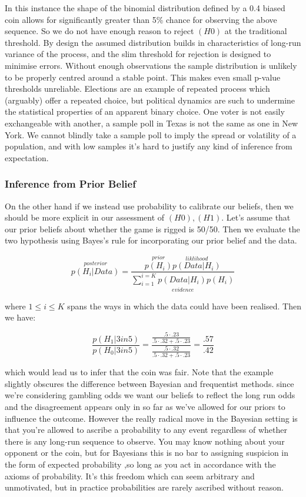 \documentclass[10pt,a4paper,notitlepage, twocolumn]{article}
\begin{document}
In this instance the shape of the binomial distribution defined by a 0.4 biased coin allows for significantly greater than  5\% chance for observing the above sequence. So we do not have enough reason to reject $(H0)$ at the traditional threshold. By design the assumed distribution builds in characteristics of long-run variance of the process, and the slim threshold for rejection is designed to minimise errors. Without enough observations the sample distribution is unlikely to be properly centred around a stable point. This makes even small p-value thresholds unreliable. Elections are an example of repeated process which (arguably) offer a repeated choice, but political dynamics are such to undermine the statistical properties of an apparent binary choice. One voter is not easily exchangeable with another, a sample poll in Texas is not the same as one in New York. We cannot blindly take a sample poll to imply the spread or volatility of a population, and with low samples it's hard to justify any kind of inference from expectation.

\subsubsection*{Inference from Prior Belief}
On the other hand if we instead use probability to calibrate our beliefs, then we should be more explicit in our assessment of $(H0), (H1)$. Let's assume that our prior beliefs about whether the game is rigged is 50/50. Then we evaluate the two hypothesis using Bayes's rule for incorporating our prior belief and the data. 

$$ \overset{posterior}{p(H_{i} | Data)} = \frac{\overset{prior}{p(H_{i})}\overset{liklihood}{p(Data | H_{i})}}{\underset{evidence}{\sum_{i=1}^{i =K} p(Data | H_{i})p(H_i)}}$$

where $ 1 \leq i \leq K$ spans the ways in which the data could have been realised. Then we have:

$$ \frac{p(H_1 | 3 in 5)}{p(H_{0} | 3 in 5)} = \frac{\frac{.5\cdot .23}{.5\cdot .32 + .5 \cdot .23}}{\frac{.5\cdot .32}{.5\cdot .32 + .5 \cdot .23}} = \frac{.57}{.42} $$

which would lead us to infer that the coin was fair. Note that the example slightly obscures the difference between Bayesian and frequentist methods. since we're considering gambling odds we want our beliefs to reflect the long run odds and the disagreement appears only in so far as we've allowed for our priors to influence the outcome. However the really radical move in the Bayesian setting is that you're allowed to ascribe a probability to any event regardless of whether there is any long-run sequence to observe. You may know nothing about your opponent or the coin, but for Bayesians this is no bar to assigning suspicion in the form of expected probability ,so long as you act in accordance with the axioms of probability. It's this freedom which can seem arbitrary and unmotivated, but in practice probabilities  are rarely ascribed without reason.
\end{document}
